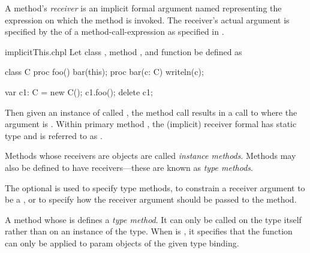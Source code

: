 A method's \emph{receiver} is an implicit formal argument
named  representing the expression on which the method is
invoked.  The receiver's actual argument is specified by the
 of a method-call-expression as specified
in .  




\begin{chapelexample}{implicitThis.chpl}
Let class , method , and function  be
defined as
\begin{chapel}
class C {
  proc foo() {
    bar(this);
  }
}
proc bar(c: C) { writeln(c); }
\end{chapel}
\begin{chapelpost}
var c1: C = new C();
c1.foo();
delete c1;
\end{chapelpost}
\begin{chapeloutput}
{}
\end{chapeloutput}
Then given an instance of  called , the method
call  results in a call to  where the
argument is .  Within primary method , the
(implicit) receiver formal has static type  and is referred to
as .
\end{chapelexample}

Methods whose receivers are objects are called \emph{instance
methods}.  Methods may also be defined to have 
receivers---these are known as \emph{type methods}.

The optional  is used to specify type methods, to
constrain a receiver argument to be a , or to specify how
the receiver argument should be passed to the method.

A method whose  is  defines a \emph{type
method}.  It can only be called on the type itself rather than on an
instance of the type.  When  is , it
specifies that the function can only be applied to param objects of
the given type binding.

